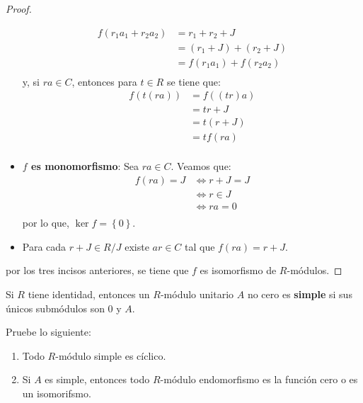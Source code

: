 \documentclass[12pt]{report}
\newcounter{it}
\theoremstyle{largebreak}
\begin{document}
\begin{proof}
\begin{itemize}
\begin{equation*}
                \begin{split}
                    f(r_1a_1+r_2a_2)&=r_1+r_2+J\\
                    &=(r_1+J)+(r_2+J)\\
                    &=f(r_1a_1)+f(r_2a_2)\\
                \end{split}
            \end{equation*}
            y, si $ra\in C$, entonces para $t\in R$ se tiene que:
            \begin{equation*}
                \begin{split}
                    f\left(t(ra) \right)&=f((tr)a)\\
                    &=tr+J\\
                    &=t(r+J)\\
                    &=tf(ra)\\
                \end{split}
            \end{equation*}
            \item \textbf{$f$ es monomorfismo}: Sea $ra\in C$. Veamos que:
            \begin{equation*}
                \begin{split}
                    f(ra)=J&\iff r+J=J\\
                    &\iff r\in J\\
                    &\iff ra=0\\
                \end{split}
            \end{equation*}
            por lo que, $\ker f=\left\{0 \right\}$.
            \item Para cada $r+J\in R/J$ existe $ar\in C$ tal que $f(ra)=r+J$.
        \end{itemize}
        por los tres incisos anteriores, se tiene que $f$ es isomorfismo de $R$-módulos.
    \end{proof}

    \begin{mydef}
        Si $R$ tiene identidad, entonces un $R$-módulo unitario $A$ no cero es \textbf{simple} si sus únicos submódulos son $0$ y $A$.
    \end{mydef}

    \begin{excer}[Nombre]
        Pruebe lo siguiente:
        \begin{enumerate}[label = \textit{(\arabic*)}]
            \item Todo $R$-módulo simple es cíclico.
            \item Si $A$ es simple, entonces todo $R$-módulo endomorfismo es la función cero o es un isomorifsmo.
        \end{enumerate}
    \end{excer}
\end{document}
